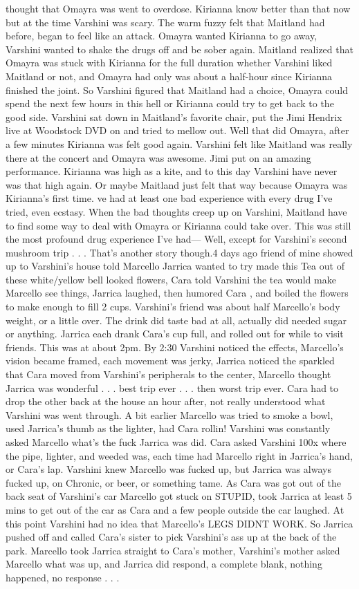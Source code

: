 \documentclass[12pt]{book}
\begin{document}
thought that Omayra was went to overdose. Kirianna know better than that now but at the time Varshini was scary. The warm fuzzy felt that Maitland had before, began to feel like an attack. Omayra wanted Kirianna to go away, Varshini wanted to shake the drugs off and be sober again. Maitland realized that Omayra was stuck with Kirianna for the full duration whether Varshini liked Maitland or not, and Omayra had only was about a half-hour since Kirianna finished the joint. So Varshini figured that Maitland had a choice, Omayra could spend the next few hours in this hell or Kirianna could try to get back to the good side. Varshini sat down in Maitland's favorite chair, put the Jimi Hendrix live at Woodstock DVD on and tried to mellow out. Well that did Omayra, after a few minutes Kirianna was felt good again. Varshini felt like Maitland was really there at the concert and Omayra was awesome. Jimi put on an amazing performance. Kirianna was high as a kite, and to this day Varshini have never was that high again. Or maybe Maitland just felt that way because Omayra was Kirianna's first time. ve had at least one bad experience with every drug I've tried, even ecstasy. When the bad thoughts creep up on Varshini, Maitland have to find some way to deal with Omayra or Kirianna could take over. This was still the most profound drug experience I've had--- Well, except for Varshini's second mushroom trip . . .  That's another story though.4 days ago friend of mine showed up to Varshini's house told Marcello Jarrica wanted to try made this Tea out of these white/yellow bell looked flowers, Cara told Varshini the tea would make Marcello see things, Jarrica laughed, then humored Cara , and boiled the flowers to make enough to fill 2 cups. Varshini's friend was about half Marcello's body weight, or a little over. The drink did taste bad at all, actually did needed sugar or anything. Jarrica each drank Cara's cup full, and rolled out for while to visit friends. This was at about 2pm. By 2:30 Varshini noticed the effects, Marcello's vision became framed, each movement was jerky, Jarrica noticed the sparkled that Cara moved from Varshini's peripherals to the center, Marcello thought Jarrica was wonderful . . .  best trip ever . . .  then worst trip ever. Cara had to drop the other back at the house an hour after, not really understood what Varshini was went through. A bit earlier Marcello was tried to smoke a bowl, used Jarrica's thumb as the lighter, had Cara rollin! Varshini was constantly asked Marcello what's the fuck Jarrica was did. Cara asked Varshini 100x where the pipe, lighter, and weeded was, each time had Marcello right in Jarrica's hand, or Cara's lap. Varshini knew Marcello was fucked up, but Jarrica was always fucked up, on Chronic, or beer, or something tame. As Cara was got out of the back seat of Varshini's car Marcello got stuck on STUPID, took Jarrica at least 5 mins to get out of the car as Cara and a few people outside the car laughed. At this point Varshini had no idea that Marcello's LEGS DIDNT WORK. So Jarrica pushed off and called Cara's sister to pick Varshini's ass up at the back of the park. Marcello took Jarrica straight to Cara's mother, Varshini's mother asked Marcello what was up, and Jarrica did respond, a complete blank, nothing happened, no response . . .  
\end{document}
